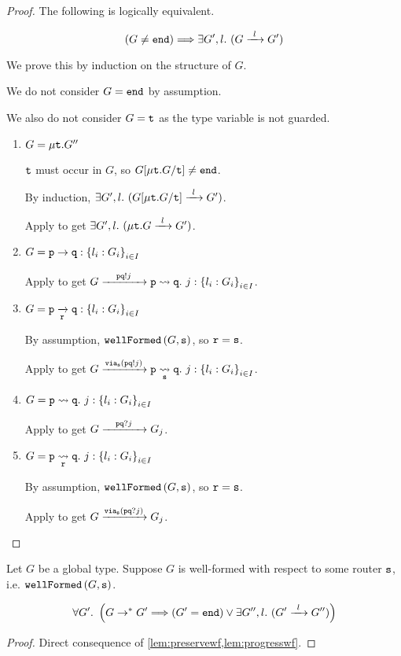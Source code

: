 \begin{proof}
The following is logically equivalent.

\[
(G \neq \tend)
	\Longrightarrow 
\exists G', l. ~ (\treduce{G}{G'}{l})
\]

We prove this by induction on the structure of $G$.

We do not consider $G = \tend$ by assumption.

We also do not consider $G = \trecvar$ as the type variable is not guarded.

\begin{enumerate}

\item $G = \trec{G''}$

$\trecvar$ must occur in $G$, so $G[\trec{G} / \trecvar] \neq \tend$.

By induction, 
$\exists G', l. ~ (\treduce{G[\trec{G} / \trecvar]}{G'}{l})$.

Apply  to get 
$\exists G', l. ~ (\treduce{\trec{G}}{G'}{l})$.

\item $G = \gcomm{p}{q}{l_i: G_i}{i \in I}$

Apply  to get 
$\treducelong
	{G}
	{\gtrans{p}{q}{j}{l_i: G_i}{i \in I}}
	{\aout{p}{q}{j}}$.

\item $G = \groute{p}{q}{r}{l_i: G_i}{i \in I}$

By assumption, $\wfnew{G}{s}$, so $\mrole{r} = \mrole{s}$.

Apply  to get
$\treducelong
	{G}
	{\gtransroute{p}{q}{s}{j}{l_i: G_i}{i \in I}}
	{\via{s}{\aout{p}{q}{j}}}$.

\item $G = \gtrans{p}{q}{j}{l_i: G_i}{i \in I}$

Apply  to get 
$\treducelong
	{G}
	{G_j}
	{\ain{p}{q}{j}}$.

\item $G = \gtransroute{p}{q}{r}{j}{l_i: G_i}{i \in I}$

By assumption, $\wfnew{G}{s}$, so $\mrole{r} = \mrole{s}$.

Apply  to get
$\treducelong
	{G}
	{G_j}
	{\via{s}{\ain{p}{q}{j}}}$.

\end{enumerate}

\end{proof}

\begin{theorem}
Let $G$ be a global type.
Suppose $G$ is well-formed with respect to some router $\mrole{s}$,
i.e. $\wfnew{G}{s}$.

\[
\forall G'. ~ \left(
G \to^* G'
	\Longrightarrow
(G' = \tend) \vee \exists G'', l. ~ 
	(\treduce{G'}{G''}{l})
\right)\]

\end{theorem}

\begin{proof}
Direct consequence of 
\cref{lem:preservewf,lem:progresswf}.
\end{proof}